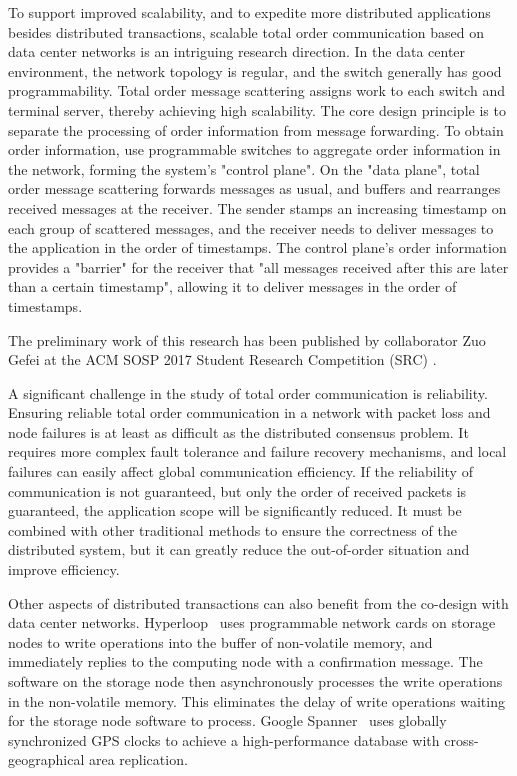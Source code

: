 To support improved scalability, and to expedite more distributed applications besides distributed transactions, scalable total order communication based on data center networks is an intriguing research direction. In the data center environment, the network topology is regular, and the switch generally has good programmability. Total order message scattering assigns work to each switch and terminal server, thereby achieving high scalability. The core design principle is to separate the processing of order information from message forwarding. To obtain order information, use programmable switches to aggregate order information in the network, forming the system's "control plane". On the "data plane", total order message scattering forwards messages as usual, and buffers and rearranges received messages at the receiver. The sender stamps an increasing timestamp on each group of scattered messages, and the receiver needs to deliver messages to the application in the order of timestamps. The control plane's order information provides a "barrier" for the receiver that "all messages received after this are later than a certain timestamp", allowing it to deliver messages in the order of timestamps.

The preliminary work of this research has been published by collaborator Zuo Gefei at the ACM SOSP 2017 Student Research Competition (SRC) \cite{toms}.

A significant challenge in the study of total order communication is reliability. Ensuring reliable total order communication in a network with packet loss and node failures is at least as difficult as the distributed consensus problem. It requires more complex fault tolerance and failure recovery mechanisms, and local failures can easily affect global communication efficiency. If the reliability of communication is not guaranteed, but only the order of received packets is guaranteed, the application scope will be significantly reduced. It must be combined with other traditional methods to ensure the correctness of the distributed system, but it can greatly reduce the out-of-order situation and improve efficiency.

Other aspects of distributed transactions can also benefit from the co-design with data center networks.
Hyperloop~\cite{kim2018hyperloop} uses programmable network cards on storage nodes to write operations into the buffer of non-volatile memory, and immediately replies to the computing node with a confirmation message. The software on the storage node then asynchronously processes the write operations in the non-volatile memory. This eliminates the delay of write operations waiting for the storage node software to process.
Google Spanner~\cite{corbett2013spanner} uses globally synchronized GPS clocks to achieve a high-performance database with cross-geographical area replication.

